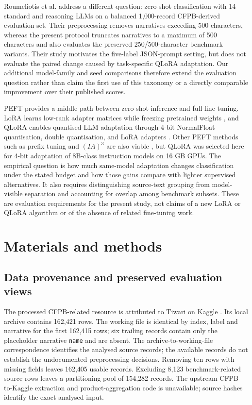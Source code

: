 \documentclass{elektr}
\begin{document}
Roumeliotis et al. \cite{roumeliotis2025think} address a different question: zero-shot classification with 14 standard and reasoning LLMs on a balanced 1,000-record CFPB-derived evaluation set. Their preprocessing removes narratives exceeding 500 characters, whereas the present protocol truncates narratives to a maximum of 500 characters and also evaluates the preserved 250/500-character benchmark variants. Their study motivates the five-label JSON-prompt setting, but does not evaluate the paired change caused by task-specific QLoRA adaptation. Our additional model-family and seed comparisons therefore extend the evaluation question rather than claim the first use of this taxonomy or a directly comparable improvement over their published scores.

PEFT provides a middle path between zero-shot inference and full fine-tuning. LoRA learns low-rank adapter matrices while freezing pretrained weights \cite{hu2022lora}, and QLoRA enables quantised LLM adaptation through 4-bit NormalFloat quantisation, double quantisation, and LoRA adapters \cite{dettmers2023qlora}. Other PEFT methods such as prefix tuning and $(IA)^3$ are also viable \cite{li2021prefix,liu2022fewshot}, but QLoRA was selected here for 4-bit adaptation of 8B-class instruction models on 16 GB GPUs. The empirical question is how much same-model adaptation changes classification under the stated budget and how those gains compare with lighter supervised alternatives. It also requires distinguishing source-text grouping from model-visible separation and accounting for overlap among benchmark subsets. These are evaluation requirements for the present study, not claims of a new LoRA or QLoRA algorithm or of the absence of related fine-tuning work.



\section{Materials and methods}
\subsection{Data provenance and preserved evaluation views}
\label{sec:source}
The processed CFPB-related resource is attributed to Tiwari on Kaggle \cite{tiwari2021complaints,cfpbdata}. Its local archive contains 162,421 rows. The working file is identical by index, label and narrative for the first 162,415 rows; six trailing records contain only the placeholder narrative \texttt{name} and are absent. The archive-to-working-file correspondence identifies the analysed source records; the available records do not establish the undocumented preprocessing decisions. Removing ten rows with missing fields leaves 162,405 usable records. Excluding 8,123 benchmark-related source rows leaves a partitioning pool of 154,282 records. The upstream CFPB-to-Kaggle extraction and product-aggregation code is unavailable; source hashes identify the exact analysed input.
\end{document}
